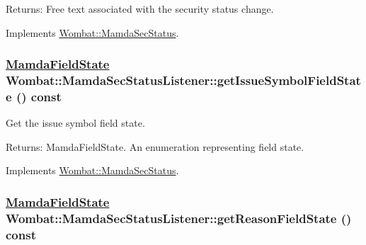 \begin{Desc}
\item[Returns:]Free text associated with the security status change. \end{Desc}


Implements \hyperlink{classWombat_1_1MamdaSecStatus_df2540961aed13114c3799839d59d975}{Wombat::Mamda\-Sec\-Status}.\hypertarget{classWombat_1_1MamdaSecStatusListener_bfbb5289809053bd0864dbbec9f40edf}{
\subsubsection[getIssueSymbolFieldState]{\setlength{\rightskip}{0pt plus 5cm}\hyperlink{namespaceWombat_93aac974f2ab713554fd12a1fa3b7d2a}{Mamda\-Field\-State} Wombat::Mamda\-Sec\-Status\-Listener::get\-Issue\-Symbol\-Field\-State () const}}
\label{classWombat_1_1MamdaSecStatusListener_bfbb5289809053bd0864dbbec9f40edf}


Get the issue symbol field state. 

\begin{Desc}
\item[Returns:]Mamda\-Field\-State. An enumeration representing field state. \end{Desc}


Implements \hyperlink{classWombat_1_1MamdaSecStatus_9ec78fc150849e2bda7802f01d5b692c}{Wombat::Mamda\-Sec\-Status}.\hypertarget{classWombat_1_1MamdaSecStatusListener_b24a32e99973888050277f1cac1a23f5}{
\subsubsection[getReasonFieldState]{\setlength{\rightskip}{0pt plus 5cm}\hyperlink{namespaceWombat_93aac974f2ab713554fd12a1fa3b7d2a}{Mamda\-Field\-State} Wombat::Mamda\-Sec\-Status\-Listener::get\-Reason\-Field\-State () const}}
\label{classWombat_1_1MamdaSecStatusListener_b24a32e99973888050277f1cac1a23f5}


